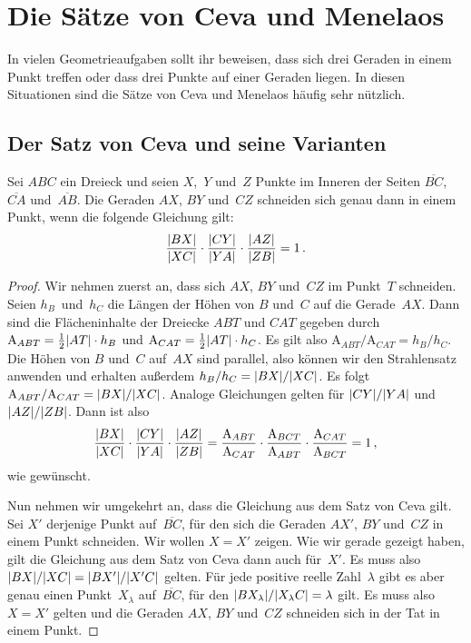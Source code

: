 \section{Die Sätze von Ceva und Menelaos}\label{kapitel:CevaMenelaos}
In vielen Geometrieaufgaben sollt ihr beweisen, dass sich drei Geraden in einem Punkt treffen oder dass drei Punkte auf einer Geraden liegen. In diesen Situationen sind die Sätze von Ceva und Menelaos häufig sehr nützlich.

\subsection*{Der Satz von Ceva und seine Varianten}
\begin{satzmitnamen}
	Sei $ABC$ ein Dreieck und seien $X$,~$Y$ und~$Z$ Punkte im Inneren der Seiten $\overline{BC}$, $\overline{CA}$ und~$\overline{AB}$. Die Geraden $AX$, $BY$ und~$CZ$ schneiden sich genau dann in einem Punkt, wenn die folgende Gleichung gilt:
	\begin{equation*}%
		\frac{\abs{BX}}{\abs{XC}}\cdot \frac{\abs{CY}}{\abs{YA}}\cdot \frac{\abs{AZ}}{\abs{ZB}}=1\,.
	\end{equation*}
\end{satzmitnamen}

\begin{proof}
	Wir nehmen zuerst an, dass sich $AX$, $BY$ und~$CZ$ im Punkt~$T$ schneiden. Seien $h_B$~und~$h_C$ die Längen der Höhen von $B$ und~$C$ auf die Gerade~$AX$. Dann sind die Flächeninhalte der Dreiecke $ABT$ und $CAT$ gegeben durch $\mathrm{A}_{ABT}=\frac 12\lvert AT\rvert\cdot h_B$ und $\mathrm{A}_{CAT}=\frac12 \lvert AT\rvert\cdot h_C$. Es gilt also $\mathrm{A}_{ABT}/\mathrm{A}_{CAT}=h_B/h_C$. Die Höhen von $B$ und~$C$ auf~$AX$ sind parallel, also können wir den Strahlensatz anwenden und erhalten außerdem $h_B/h_C=\lvert BX\rvert/\lvert XC\rvert$. Es folgt $\mathrm{A}_{ABT}/\mathrm{A}_{CAT}=\lvert BX\rvert/\lvert XC\rvert$. Analoge Gleichungen gelten für $\lvert CY\rvert/\lvert YA\rvert$ und $\lvert AZ\rvert/\lvert ZB\rvert$. Dann ist also
	\begin{equation*}
		\frac{\lvert BX\rvert}{\lvert XC\rvert}\cdot \frac{\lvert CY\rvert}{\lvert YA\rvert}\cdot \frac{\lvert AZ\rvert}{\lvert ZB\rvert}=\frac{\mathrm{A}_{ABT}}{\mathrm{A}_{CAT}}\cdot \frac{\mathrm{A}_{BCT}}{\mathrm{A}_{ABT}}\cdot \frac{\mathrm{A}_{CAT}}{\mathrm{A}_{BCT}}=1\,,
	\end{equation*}
	wie gewünscht.
	
	Nun nehmen wir umgekehrt an, dass die Gleichung aus dem Satz von Ceva gilt. Sei $X'$ derjenige Punkt auf~$\overline{BC}$, für den sich die Geraden $AX'$, $BY$ und~$CZ$ in einem Punkt schneiden. Wir wollen $X=X'$ zeigen. Wie wir gerade gezeigt haben, gilt die Gleichung aus dem Satz von Ceva dann auch für~$X'$. Es muss also $\lvert BX\rvert/\lvert XC\rvert=\lvert BX'\rvert/\lvert X'C\rvert$ gelten. Für jede positive reelle Zahl~$\lambda$ gibt es aber genau einen Punkt~$X_\lambda$ auf~$\overline{BC}$, für den $\lvert BX_\lambda\rvert/\lvert X_\lambda C\rvert=\lambda$ gilt. Es muss also $X=X'$ gelten und die Geraden $AX$, $BY$ und~$CZ$ schneiden sich in der Tat in einem Punkt.
\end{proof}

